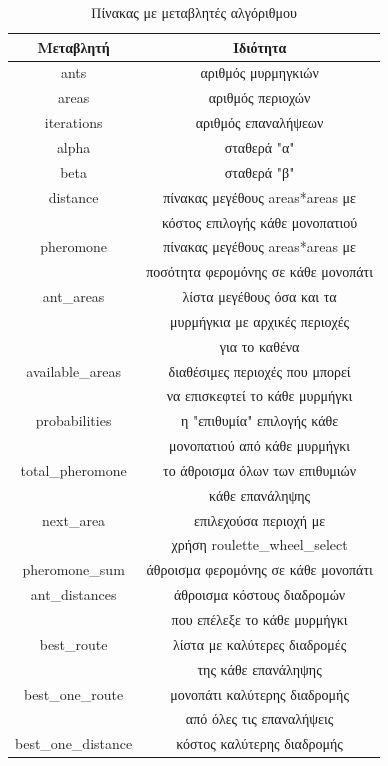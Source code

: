 \begin{table}
\begin{center}
\begin{tabular}{|c|c|}
    \hline
    {\bf Μεταβλητή} & {\bf Ιδιότητα}\\ \hline
    ants & αριθμός μυρμηγκιών\\ \hline
    areas & αριθμός περιοχών\\ \hline
    iterations & αριθμός επαναλήψεων\\ \hline
    alpha & σταθερά "α"\\ \hline
    beta & σταθερά "β" \\ \hline
    distance & πίνακας μεγέθους areas*areas με\\
    &  κόστος επιλογής κάθε μονοπατιού\\ \hline
    pheromone & πίνακας μεγέθους areas*areas με\\ 
    & ποσότητα φερομόνης σε κάθε μονοπάτι\\ \hline
    ant\_areas & λίστα μεγέθους όσα και τα\\ 
    & μυρμήγκια με αρχικές περιοχές\\
    & για το καθένα\\ \hline
    available\_areas & διαθέσιμες περιοχές που μπορεί\\ 
    & να επισκεφτεί το κάθε μυρμήγκι\\ \hline
    probabilities & η "επιθυμία" επιλογής κάθε\\
    & μονοπατιού από κάθε μυρμήγκι\\ \hline
    total\_pheromone & το άθροισμα όλων των επιθυμιών\\ 
    & κάθε επανάληψης\\ \hline
    next\_area & επιλεχούσα περιοχή με\\ 
    & χρήση roulette\_wheel\_select\\ \hline
    pheromone\_sum & άθροισμα φερομόνης σε κάθε μονοπάτι\\ \hline
    ant\_distances & άθροισμα κόστους διαδρομών\\ 
    & που επέλεξε το κάθε μυρμήγκι\\ \hline
    best\_route & λίστα με καλύτερες διαδρομές\\
    & της κάθε επανάληψης\\ \hline
    best\_one\_route & μονοπάτι καλύτερης διαδρομής\\
    & από όλες τις επαναλήψεις\\ \hline
    best\_one\_distance & κόστος καλύτερης διαδρομής\\ \hline

\end{tabular}
\end{center}
\caption{Πίνακας με μεταβλητές αλγόριθμου}
\end{table}


